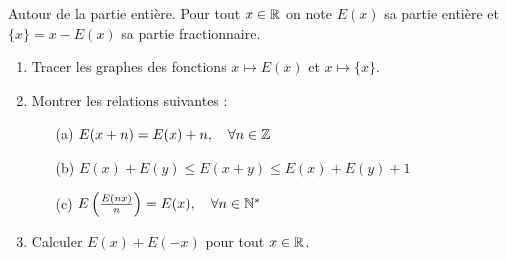 \documentclass[solutions]{exercices}
\begin{document}
\begin{exercice}[\di]
	Autour de la partie entière.
	Pour tout $x \in \mathbb{R}$ on note $E(x)$ sa partie entière et $\{x\} = x - E(x)$ sa partie fractionnaire.
	\begin{enumerate}
		\item Tracer les graphes des fonctions $x \mapsto E(x)$ et $x \mapsto \{x\}$.
		\item Montrer les relations suivantes :
		      \begin{enumerate}
			      \item[(a)] $E(x+n) = E(x) + n, \quad \forall n \in \mathbb{Z}$
			      \item[(b)] $E(x) + E(y) \leq E(x+y) \leq E(x) + E(y) + 1$
			      \item[(c)] $E\left(\frac{E(nx)}{n}\right) = E(x), \quad \forall n \in \mathbb{N}^*$
		      \end{enumerate}
		\item Calculer $E(x) + E(-x)$ pour tout $x \in \mathbb{R}$.
	\end{enumerate}
\end{exercice}
\end{document}
